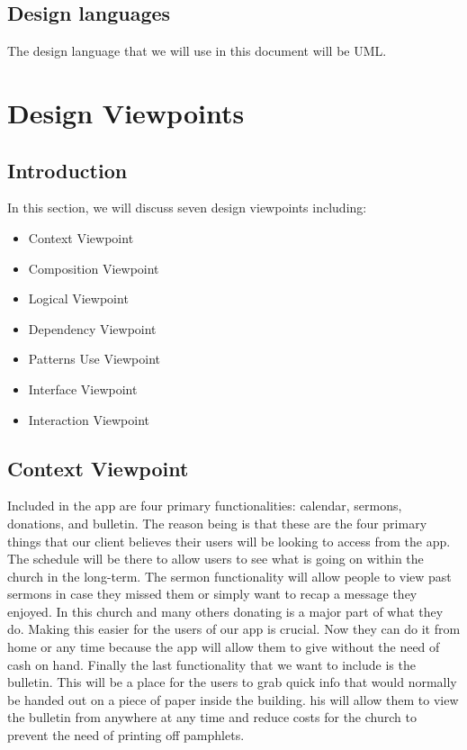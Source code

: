 \documentclass[letterpaper,10pt,draftclsnofoot,onecolumn,titlepage]{IEEEtran}
\begin{document}
		\subsection{Design languages}
		The design language that we will use in this document will be UML.

	\section{Design Viewpoints}

		\subsection{Introduction}
		In this section, we will discuss seven design viewpoints including:
			\begin{itemize}
				\item{Context Viewpoint}
				\item{Composition Viewpoint}
				\item{Logical Viewpoint}
				\item{Dependency Viewpoint}
				\item{Patterns Use Viewpoint}
				\item{Interface Viewpoint}
				\item{Interaction Viewpoint}
			\end{itemize}

		\subsection{Context Viewpoint}
		Included in the app are four primary functionalities: calendar, sermons, donations, and bulletin.
		The reason being is that these are the four primary things that our client believes their users will be looking to access from the app.
		The schedule will be there to allow users to see what is going on within the church in the long-term.
		The sermon functionality will allow people to view past sermons in case they missed them or simply want to recap a message they enjoyed.
		In this church and many others donating is a major part of what they do.
		Making this easier for the users of our app is crucial.
		Now they can do it from home or any time because the app will allow them to give without the need of cash on hand.
		Finally the last functionality that we want to include is the bulletin.
		This will be a place for the users to grab quick info that would normally be handed out on a piece of paper inside the building.
		his will allow them to view the bulletin from anywhere at any time and reduce costs for the church to prevent the need of printing off pamphlets.
\end{document}
